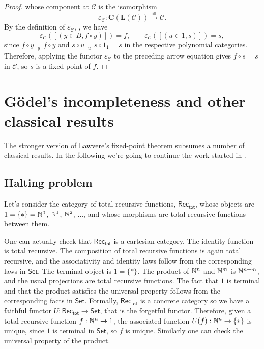 \begin{proof}
    whose component at $\mathcal C$ is the isomorphism
    \[ \varepsilon_{\mathcal C} : \mathbf C(\mathbf L(\mathcal C)) \xrightarrow{\cong} \mathcal C. \]
    By the definition of $\varepsilon_{\mathcal C}$, , we have
    \[ \varepsilon_{\mathcal C}([(y \in B,f \circ y)]) = f, \qquad \varepsilon_{\mathcal C}([(u \in 1,s)]) = s, \]
    since $f \circ y \underset{y}{=} f \circ y$ and $s \circ u \underset{u}{=} s \circ 1_1=s$ in the respective polynomial categories.
    Therefore, applying the functor $\varepsilon_{\mathcal C}$ to the preceding arrow equation gives $f \circ s=s$ in $\mathcal C$, so $s$ is a fixed point of $f$.
\end{proof}

\section{Gödel's incompleteness and other classical results}\label{sec:godel-incompleteness-and-other-classical-results}
The stronger version of Lawvere's fixed-point theorem subsumes a number of classical results.
In the following we're going to continue the work started in .

\subsection*{Halting problem}
Let's consider the category of total recursive functions, $\mathsf{Rec_{tot}}$, whose objects are $1 = \{*\} = \mathbb{N}^0$, $\mathbb{N}^1$, $\mathbb{N}^2$, $\ldots$, and whose morphisms are total recursive functions between them.\label{idx:total-recursive-category}

\begin{remark}
    One can actually check that $\mathsf{Rec_{tot}}$ is a cartesian category. The identity function is total recursive. The composition of total recursive functions is again total recursive,
    and the associativity and identity laws follow from the corresponding laws in $\mathsf{Set}$.\newline
    The terminal object is $1 = \{*\}$. The product of $\mathbb{N}^n$ and $\mathbb{N}^m$ is $\mathbb{N}^{n+m}$, and the usual projections are total recursive functions. The fact that $1$ is terminal and that the product satisfies the universal property follows from the corresponding facts in $\mathsf{Set}$.
    Formally, $\mathsf{Rec_{tot}}$ is a concrete category so we have a faithful functor $U : \mathsf{Rec_{tot}} \to \mathsf{Set}$, that is the forgetful functor.
    Therefore, given a total recursive function $f : \mathbb{N}^n \to 1$, the associated function $U(f) : \mathbb{N}^n \to \{*\}$ is unique, since $1$ is terminal in $\mathsf{Set}$, so $f$ is unique. Similarly one can check the universal property of the product.
\end{remark}

